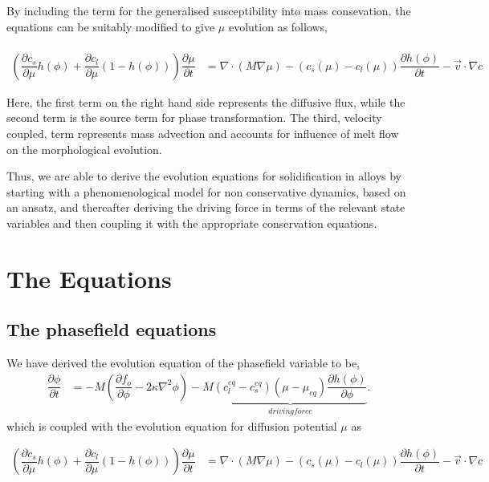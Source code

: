 \documentclass[12pt,a4paper]{report}
\begin{document}
By including the term for the generalised susceptibility into mass consevation, the equations can be suitably modified to give
$\mu$ evolution as follows,\\
\\
 \begin{align}
 \left(\dfrac{\partial c_s}{\partial \mu}h\left(\phi\right) + \dfrac{\partial c_l}{\partial \mu}(1-h\left(\phi\right))\right)
 \dfrac{\partial \mu}{\partial t} &= \nabla \cdot \left(M\nabla\mu\right) 
 - \left(c_s\left(\mu\right) - c_l \left(\mu\right)\right)\dfrac{\partial h\left(\phi\right)}{\partial t} - \vec{v}\cdot\nabla c
 \label{Mass-conservation-alloys}
 \end{align}
 
 Here, the first term on the right hand side represents the diffusive flux, while
 the second term is the source term for phase transformation. The third, velocity coupled,
 term represents mass advection and accounts for influence of melt flow on the morphological 
 evolution. 

 Thus, we are able to derive the evolution equations for solidification in alloys by starting 
 with a phenomenological model for non conservative dynamics, based on an ansatz, and thereafter 
 deriving the driving force in terms of the relevant state variables and then coupling it with the 
 appropriate conservation equations.


\chapter{The Equations}
\section{The phasefield equations}
We have derived the evolution equation of the phasefield variable to be,
  \begin{align}
  \dfrac{\partial \phi}{\partial t} &= -M \left(\dfrac{\partial f_o}{\partial \phi} - 2\kappa\nabla^{2}\phi\right)  
					-M\underbrace{(c_l^{eq} - c_s^{eq})\left(\mu-\mu_{eq}\right)\dfrac{\partial h\left(\phi\right)}{\partial \phi}}_{driving force}.
  \end{align}
which is coupled with the evolution equation for diffusion potential $\mu$ as

 \begin{align}
 \left(\dfrac{\partial c_s}{\partial \mu}h\left(\phi\right) + \dfrac{\partial c_l}{\partial \mu}(1-h\left(\phi\right))\right)
 \dfrac{\partial \mu}{\partial t} &= \nabla \cdot \left(M\nabla\mu\right) 
 - \left(c_s\left(\mu\right) - c_l \left(\mu\right)\right)\dfrac{\partial h\left(\phi\right)}{\partial t} - \vec{v}\cdot\nabla c
 \label{Mass-conservation-alloys}
 \end{align}
\end{document}
